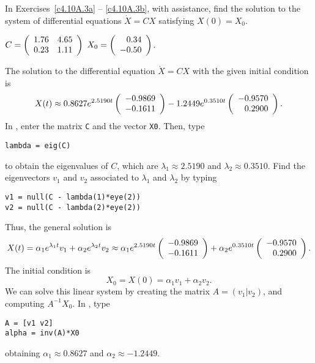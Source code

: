 \documentclass{ximera}
\begin{document}
\CEXER

\noindent In Exercises~\ref{c4.10A.3a} -- \ref{c4.10A.3b}, with \Matlab
assistance, find the solution to the system of differential equations
$\dot{X} = CX$ satisfying $X(0)=X_0$.
\begin{exercise}  \label{c4.10A.3a}
$C = \left(\begin{array}{rr} 1.76 & 4.65\\ 0.23 &1.11\end{array}\right)$ \AND $X_0 = \left(\begin{array}{r} 0.34 \\ -0.50\end{array}\right)$.

\begin{solution}
\ans The solution to the differential equation $\dot{X}
= CX$ with the given initial condition is
\[
X(t) \approx 0.8627e^{2.5190t}\left(\begin{array}{r} -0.9869 \\ -0.1611\end{array}\right)
- 1.2449e^{0.3510t}\left(\begin{array}{r} -0.9570 \\ 0.2900\end{array}\right).
\]
\soln In \Matlabp, enter the matrix {\tt C} and the vector {\tt X0}.  Then,
type
\begin{verbatim}
lambda = eig(C)
\end{verbatim}
to obtain the eigenvalues of $C$, which are
$\lambda_1 \approx 2.5190$ and $\lambda_2 \approx 0.3510$.  Find the
eigenvectors $v_1$ and $v_2$ associated to $\lambda_1$ and $\lambda_2$
by typing
\begin{verbatim}
v1 = null(C - lambda(1)*eye(2))
v2 = null(C - lambda(2)*eye(2))
\end{verbatim}
Thus, the general solution is
\[
X(t) = \alpha_1e^{\lambda_1 t}v_1 + \alpha_2e^{\lambda_2 t}v_2
\approx \alpha_1e^{2.5190t}\left(\begin{array}{r} -0.9869 \\ -0.1611\end{array}\right) +
\alpha_2e^{0.3510t}\left(\begin{array}{r} -0.9570 \\ 0.2900\end{array}\right).
\]
The initial condition is
\[
X_0 = X(0) = \alpha_1v_1 + \alpha_2v_2.
\]
We can solve this linear system by creating the matrix $A = (v_1|v_2)$, and
computing $A^{-1}X_0$.  In \Matlabp, type
\begin{verbatim}
A = [v1 v2]
alpha = inv(A)*X0
\end{verbatim}
obtaining $\alpha_1 \approx 0.8627$ and $\alpha_2 \approx -1.2449$.


\end{solution}
\end{exercise}
\end{document}
